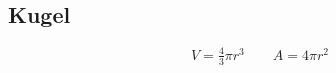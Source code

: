 \begin{table}[H]
\begin{tabularx}{0.9\columnwidth}{lXl}
\end{tabularx}
\end{table}

\subsection{Kugel}
\begin{equation*}
	V= \tfrac{4}{3}\pi r^3 \quad \quad A= 4\pi r^{2}
\end{equation*}


